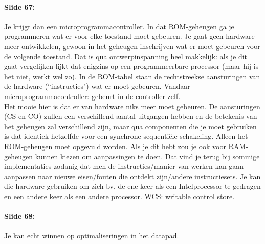 \documentclass[10pt,a4paper]{book}
\begin{document}
\paragraph{Slide 67:} Je krijgt dan een microprogrammacontroller. In dat ROM-geheugen ga je programmeren wat er voor elke toestand moet gebeuren. Je gaat geen hardware meer ontwikkelen, gewoon in het geheugen inschrijven wat er moet gebeuren voor de volgende toestand. Dat is qua ontwerpinspanning heel makkelijk: als je dit gaat vergelijken lijkt dat enigzins op een programmeerbare processor (maar hij is het niet, werkt wel zo). In de ROM-tabel staan de rechtstreekse aansturingen van de hardware (``instructies") wat er moet gebeuren. Vandaar microprogrammacontroller: gebeurt in de controller zelf.\\
Het mooie hier is dat er van hardware niks meer moet gebeuren. De aansturingen (CS en CO) zullen een verschillend aantal uitgangen hebben en de betekenis van het geheugen zal verschillend zijn, maar qua componenten die je moet gebruiken is dat identiek hetzelfde voor een synchrone sequenti\"ele schakeling. Alleen het ROM-geheugen moet opgevuld worden. Als je dit hebt zou je ook voor RAM-geheugen kunnen kiezen om aanpassingen te doen. Dat vind je terug bij sommige implementaties zodanig dat men de instructies/manier van werken kan gaan aanpassen naar nieuwe eisen/fouten die ontdekt zijn/andere instructiesets. Je kan die hardware gebruiken om zich bv. de ene keer als een Intelprocessor te gedragen en een andere keer als een andere processor. WCS: writable control store.

\paragraph{Slide 68:} Je kan echt winnen op optimaliseringen in het datapad.
\end{document}
